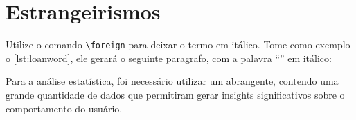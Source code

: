 \begin{table}[htb]
	\begin{center}
	\end{center}
\end{table}

\begin{table}[htb]
	\begin{center}
	\end{center}
\end{table}

\section{Estrangeirismos}

Utilize o comando \texttt{\textbackslash foreign} para deixar o termo em itálico. Tome como exemplo o \autoref{lst:loanword}, ele gerará o seguinte paragrafo, com a palavra \enquote{\dataset} em itálico:

Para a análise estatística, foi necessário utilizar um 
 abrangente, contendo uma grande quantidade 
de dados que permitiram gerar insights significativos 
sobre o comportamento do usuário.

